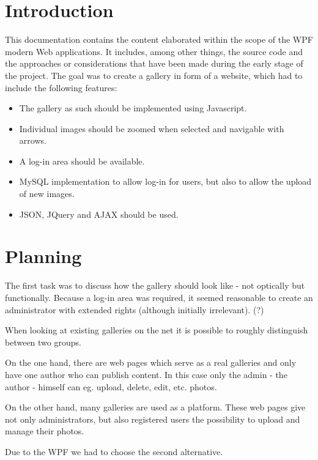 \documentclass[a4paper,12pt,oneside]{article} %
\begin{document}
 \newpage 
  
 

  

\newpage

\section{Introduction}

This documentation contains the content elaborated within the scope 
of the WPF modern Web applications. It includes, among other things,
the source code and the approaches or considerations that have been 
made during the early stage of the project.
The goal was to create a gallery in form of a website, which had
to include the following features:
\begin{itemize}
\item The gallery as such should be implemented using Javascript. 
\item Individual images should be zoomed when selected and navigable with arrows. 
\item A log-in area should be available. 
\item MySQL implementation to allow log-in for users, but also to allow the upload of new images. 
\item JSON, JQuery and AJAX should be used.
\end{itemize}

\section{Planning}

The first task was to discuss how the gallery should look like
- not optically but functionally. Because a log-in area was required,
it seemed reasonable to create an administrator with extended
rights (although initially irrelevant). (?)

When looking at existing galleries on the net it is possible to 
roughly distinguish between two groups. 

On the one hand, there are web pages which serve as a real galleries and 
only have one author who can publish content. In this case only the admin 
- the author - himself can eg. upload, delete, edit, etc. photos.

On the other hand, many galleries are used as a platform.
These web pages give not only administrators, but also registered users 
the possibility to upload and manage their photos.

Due to the WPF we had to choose the second alternative. 
\end{document}
